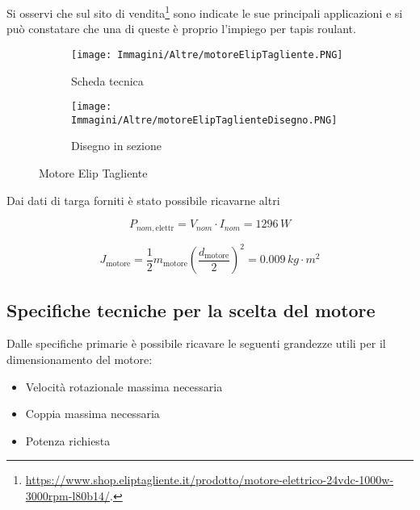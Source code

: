 \documentclass[a4paper,12pt]{article}
\begin{document}
\vspace{0.5em} 

Si osservi che sul sito di vendita\footnote{\url{https://www.shop.eliptagliente.it/prodotto/motore-elettrico-24vdc-1000w-3000rpm-l80b14/}.} sono indicate le sue principali applicazioni e si può constatare che una di queste è proprio l'impiego per tapis roulant.

\begin{figure}[h!]
    \centering
    \begin{subfigure}[b]{0.45\textwidth}
        \centering
        \texttt{[image: Immagini/Altre/motoreElipTagliente.PNG]}
        \caption{Scheda tecnica}
        \label{fig:motore1}
    \end{subfigure}
    \hfill
    \begin{subfigure}[b]{0.45\textwidth}
        \centering
        \texttt{[image: Immagini/Altre/motoreElipTaglienteDisegno.PNG]}
        \caption{Disegno in sezione}
        \label{fig:motore2}
    \end{subfigure}
    \caption{Motore Elip Tagliente}
    \label{fig:Motore1+2}
\end{figure}

\vspace{0.5em}


Dai dati di targa forniti è stato possibile ricavarne altri

\[
    P_{nom, \text{elettr}} = V_{nom} \cdot I_{nom} = 1296\,W
\]

\[
    J_{\text{motore}} = \frac{1}{2} m_{\text{motore}} \left(\frac{d_{\text{motore}}}{2}\right)^2 = 0.009 \, kg \cdot m^2
\]

\vspace{0.5em}

\subsection{Specifiche tecniche per la scelta del motore}

Dalle specifiche primarie è possibile ricavare le seguenti grandezze utili per il dimensionamento del motore:

\begin{itemize}
    \item Velocità rotazionale massima necessaria
    \item Coppia massima necessaria
    \item Potenza richiesta
\end{itemize}
\end{document}
